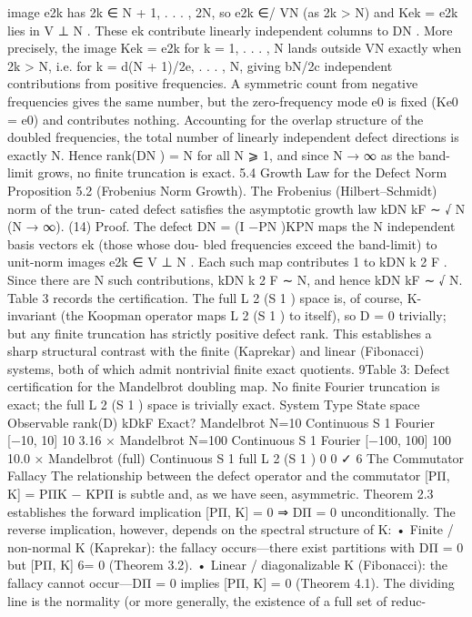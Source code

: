 image e2k has 2k ∈ {N + 1, . . . , 2N}, so e2k ∈/ VN (as 2k > N) and Kek = e2k lies in V
⊥
N . These ek
contribute linearly independent columns to DN .
More precisely, the image Kek = e2k for k = 1, . . . , N lands outside VN exactly when 2k > N,
i.e. for k = d(N + 1)/2e, . . . , N, giving bN/2c independent contributions from positive frequencies.
A symmetric count from negative frequencies gives the same number, but the zero-frequency mode
e0 is fixed (Ke0 = e0) and contributes nothing. Accounting for the overlap structure of the doubled
frequencies, the total number of linearly independent defect directions is exactly N.
Hence rank(DN ) = N for all N ⩾ 1, and since N → ∞ as the band-limit grows, no finite
truncation is exact.
5.4 Growth Law for the Defect Norm
Proposition 5.2 (Frobenius Norm Growth). The Frobenius (Hilbert–Schmidt) norm of the trun-
cated defect satisfies the asymptotic growth law
kDN kF ∼
√
N (N → ∞). (14)
Proof. The defect DN = (I −PN )KPN maps the N independent basis vectors ek (those whose dou-
bled frequencies exceed the band-limit) to unit-norm images e2k ∈ V
⊥
N . Each such map contributes
1 to kDN k
2
F
. Since there are N such contributions, kDN k
2
F ∼ N, and hence kDN kF ∼
√
N.
Table 3 records the certification. The full L
2
(S
1
) space is, of course, K-invariant (the Koopman
operator maps L
2
(S
1
) to itself), so D = 0 trivially; but any finite truncation has strictly positive
defect rank. This establishes a sharp structural contrast with the finite (Kaprekar) and linear
(Fibonacci) systems, both of which admit nontrivial finite exact quotients.
9Table 3: Defect certification for the Mandelbrot doubling map. No finite Fourier truncation is
exact; the full L
2
(S
1
) space is trivially exact.
System Type State space Observable rank(D) kDkF Exact?
Mandelbrot N=10 Continuous S
1 Fourier [−10, 10] 10 3.16 ×
Mandelbrot N=100 Continuous S
1 Fourier [−100, 100] 100 10.0 ×
Mandelbrot (full) Continuous S
1
full L
2
(S
1
) 0 0 ✓
6 The Commutator Fallacy
The relationship between the defect operator and the commutator [PΠ, K] = PΠK − KPΠ is subtle
and, as we have seen, asymmetric. Theorem 2.3 establishes the forward implication [PΠ, K] = 0 ⇒
DΠ = 0 unconditionally. The reverse implication, however, depends on the spectral structure of K:
• Finite / non-normal K (Kaprekar): the fallacy occurs—there exist partitions with DΠ =
0 but [PΠ, K] 6= 0 (Theorem 3.2).
• Linear / diagonalizable K (Fibonacci): the fallacy cannot occur—DΠ = 0 implies
[PΠ, K] = 0 (Theorem 4.1).
The dividing line is the normality (or more generally, the existence of a full set of reduc-
